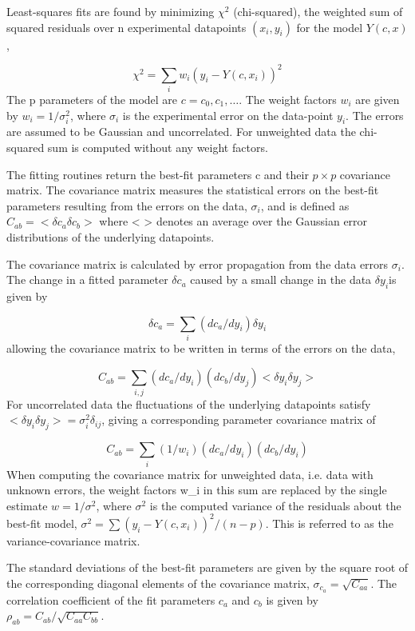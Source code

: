 Least-squares fits are found by minimizing $\chi^2$ (chi-squared), the weighted sum of squared residuals over n experimental datapoints $(x_i, y_i)$ for the model $Y(c,x)$,

$$\chi^2 = \sum_i w_i (y_i - Y(c, x_i))^2$$
The p parameters of the model are $c = {c_0, c_1, …}$. The weight factors $w_i$ are given by $w_i = 1/\sigma_i^2$, where $\sigma_i$ is the experimental error on the data-point $y_i$. The errors are assumed to be Gaussian and uncorrelated. For unweighted data the chi-squared sum is computed without any weight factors.

The fitting routines return the best-fit parameters c and their $p \times p$ covariance matrix. The covariance matrix measures the statistical errors on the best-fit parameters resulting from the errors on the data, $\sigma_i$, and is defined as $C_{ab} = <\delta c_a \delta c_b>$ where < > denotes an average over the Gaussian error distributions of the underlying datapoints.

The covariance matrix is calculated by error propagation from the data errors $\sigma_i$. The change in a fitted parameter $\delta c_a$ caused by a small change in the data $\delta y_i $is given by

$$\delta c_a = \sum_i (dc_a/dy_i) \delta y_i$$
allowing the covariance matrix to be written in terms of the errors on the data,

$$C_{ab} = \sum_{i,j} (dc_a/dy_i) (dc_b/dy_j) <\delta y_i \delta y_j>$$
For uncorrelated data the fluctuations of the underlying datapoints satisfy $<\delta y_i \delta y_j> = \sigma_i^2 \delta_{ij}$, giving a corresponding parameter covariance matrix of

$$C_{ab} = \sum_i (1/w_i) (dc_a/dy_i) (dc_b/dy_i) $$
When computing the covariance matrix for unweighted data, i.e. data with unknown errors, the weight factors w_i in this sum are replaced by the single estimate $w = 1/\sigma^2$, where $\sigma^2$ is the computed variance of the residuals about the best-fit model, $\sigma^2 = \sum (y_i - Y(c,x_i))^2 / (n-p)$. This is referred to as the variance-covariance matrix.

The standard deviations of the best-fit parameters are given by the square root of the corresponding diagonal elements of the covariance matrix, $\sigma_{c_a} = \sqrt{C_{aa}}$. The correlation coefficient of the fit parameters $c_a$ and $c_b$ is given by $\rho_{ab} = C_{ab} / \sqrt{C_{aa} C_{bb}}$.